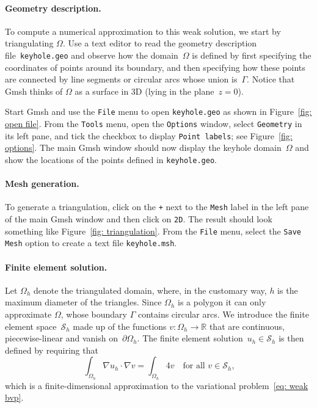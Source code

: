 \documentclass[a4paper,12pt]{article}
\begin{document}
\paragraph{Geometry description.}
To compute a numerical approximation to this weak solution, we start 
by triangulating $\Omega$.  Use a text editor to read the 
geometry description file~\verb!keyhole.geo! and observe how the 
domain~$\Omega$ is defined by first specifying the coordinates of 
points around its boundary, and then specifying how these points are 
connected by line segments or circular arcs whose union is~$\Gamma$.  
Notice that Gmsh thinks of $\Omega$ as a surface in 3D (lying in the 
plane~$z=0$).

Start Gmsh and use the \verb!File! menu to open 
\verb!keyhole.geo! as shown in Figure~\ref{fig: open file}.  
From the \verb!Tools! menu, open the \verb!Options! window, select 
\verb!Geometry! in its left pane, and tick the checkbox to display 
\verb!Point labels!; see Figure~\ref{fig: options}.  The main Gmsh 
window should now display the keyhole domain~$\Omega$ and show the 
locations of the points defined in \verb!keyhole.geo!.

\paragraph{Mesh generation.}
To generate a triangulation, click on the \verb!+! next to 
the \verb!Mesh! label in the left pane of the main Gmsh window and 
then click on \verb!2D!.  The result should look something like 
Figure~\ref{fig: triangulation}.  From the \verb!File! menu, select 
the \verb!Save Mesh! option to create a text file 
\verb!keyhole.msh!.

\paragraph{Finite element solution.}
Let $\Omega_h$ denote the triangulated domain, where, in the customary
way, $h$ is the maximum diameter of the triangles.  Since $\Omega_h$ 
is a polygon it can only approximate $\Omega$, whose boundary 
$\Gamma$ contains circular arcs.  We introduce the finite element 
space~$\mathcal{S}_h$ made up of the functions 
$v:\Omega_h\to\mathbb{R}$ that are continuous, piecewise-linear and 
vanish on~$\partial\Omega_h$.  The finite element 
solution~$u_h\in\mathcal{S}_h$ is then defined by requiring that
\begin{equation}\label{eq: finite elt problem}
\int_{\Omega_h}\nabla u_h\cdot\nabla v=\int_{\Omega_h} 4v
	\quad\text{for all $v\in\mathcal{S}_h$,}
\end{equation}
which is a finite-dimensional approximation to the variational 
problem~\eqref{eq: weak bvp}.
\end{document}
